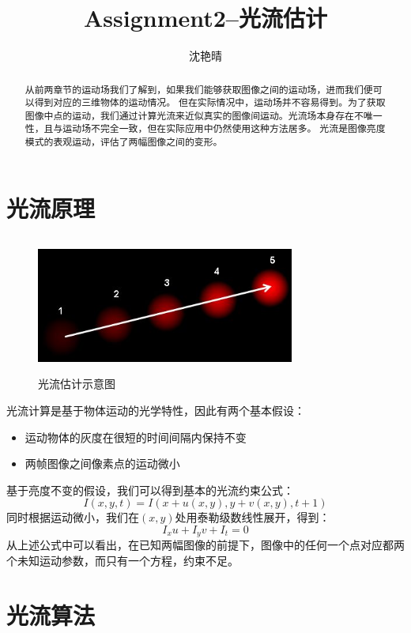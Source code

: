 \documentclass[UTF8]{ctexart}
\author{沈艳晴}
\title{Assignment2--光流估计}
\begin{document}
\begin{CJK*}{UTF8}{gbsn}
\CJKindent%
\maketitle


\begin{abstract}
从前两章节的运动场我们了解到，如果我们能够获取图像之间的运动场，进而我们便可以得到对应的三维物体的运动情况。
但在实际情况中，运动场并不容易得到。为了获取图像中点的运动，我们通过计算光流来近似真实的图像间运动。光流场本身存在不唯一性，且与运动场不完全一致，但在实际应用中仍然使用这种方法居多。
光流是图像亮度模式的表观运动，评估了两幅图像之间的变形。
\end{abstract}

\section{光流原理}
\begin{figure}[htbp]
    \centering
    \includegraphics[height=4.5cm,width=8.5cm]{optical_flow_basic1.jpg}
    \caption{光流估计示意图}
    \label{fig:opti1}
\end{figure}
光流计算是基于物体运动的光学特性，因此有两个基本假设：
\begin{itemize}
    \item 运动物体的灰度在很短的时间间隔内保持不变
    \item 两帧图像之间像素点的运动微小
\end{itemize}
基于亮度不变的假设，我们可以得到基本的光流约束公式：
\begin{equation}
    I(x,y,t) = I(x+u(x,y),y+v(x,y),t+1)
\end{equation}
同时根据运动微小，我们在$(x,y)$处用泰勒级数线性展开，得到：
\begin{equation}
    I_{x} u + I_{y} v +I_{t} =0
\end{equation}
从上述公式中可以看出，在已知两幅图像的前提下，图像中的任何一个点对应都两个未知运动参数，而只有一个方程，约束不足。

\section{光流算法}

\end{CJK*}
\end{document}
